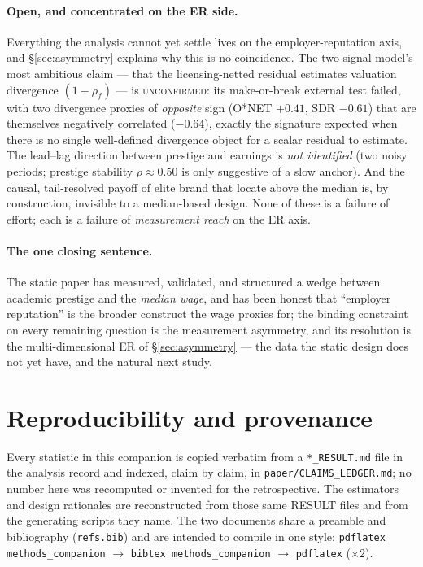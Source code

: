 \documentclass[11pt]{article}
\begin{document}
\paragraph{Open, and concentrated on the ER side.} Everything the analysis cannot yet settle lives on the
employer-reputation axis, and \S\ref{sec:asymmetry} explains why this is no coincidence. The two-signal model's
most ambitious claim --- that the licensing-netted residual estimates valuation divergence $(1-\rho_f)$ --- is
\textsc{unconfirmed}: its make-or-break external test failed, with two divergence proxies of \emph{opposite}
sign (O*NET $+0.41$, SDR $-0.61$) that are themselves negatively correlated ($-0.64$), exactly the signature
expected when there is no single well-defined divergence object for a scalar residual to estimate. The lead--lag
direction between prestige and earnings is \emph{not identified} (two noisy periods; prestige stability
$\rho\approx0.50$ is only suggestive of a slow anchor). And the causal, tail-resolved payoff of elite brand that
\citet{chetty2023diversifying} locate above the median is, by construction, invisible to a median-based design.
None of these is a failure of effort; each is a failure of \emph{measurement reach} on the ER axis.

\paragraph{The one closing sentence.} The static paper has measured, validated, and structured a wedge between
academic prestige and the \emph{median wage}, and has been honest that ``employer reputation'' is the broader
construct the wage proxies for; the binding constraint on every remaining question is the measurement asymmetry,
and its resolution is the multi-dimensional ER of \S\ref{sec:asymmetry} --- the data the static design does not
yet have, and the natural next study.

\section*{Reproducibility and provenance}
Every statistic in this companion is copied verbatim from a \texttt{*\_RESULT.md} file in the analysis record
and indexed, claim by claim, in \texttt{paper/CLAIMS\_LEDGER.md}; no number here was recomputed or invented for
the retrospective. The estimators and design rationales are reconstructed from those same RESULT files and from
the generating scripts they name. The two documents share a preamble and bibliography (\texttt{refs.bib}) and are
intended to compile in one style: \texttt{pdflatex methods\_companion} $\to$ \texttt{bibtex methods\_companion}
$\to$ \texttt{pdflatex} ($\times 2$).



\end{document}
